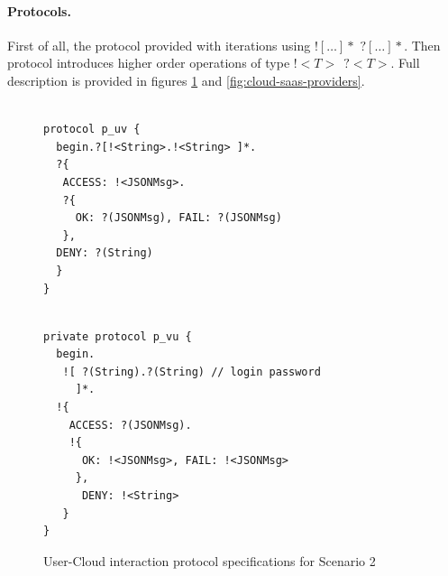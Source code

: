 \documentclass{llncs}
\begin{document}
\paragraph{Protocols.} First of all, the protocol provided with iterations using $![\dots]*$ $?[\dots]*$. Then protocol introduces higher order operations of type $!<T>\ \ ?<T>$. Full description is provided in figures \ref{fig:user-cloud-protocol} and \ref{fig:cloud-saas-providers}.
{
\lstset{
  framerule=0pt,
  numbers=none,
  basicstyle=\ttfamily\scriptsize,
}
\renewcommand\lstlistingname{Protocol}
\setcounter{lstlisting}{0}
\begin{figure}

\begin{minipage}[t]{0.50\textwidth}
\begin{lstlisting}[caption=User]

protocol p_uv { 
  begin.?[!<String>.!<String> ]*.
  ?{
   ACCESS: !<JSONMsg>.
   ?{
     OK: ?(JSONMsg), FAIL: ?(JSONMsg)
   },
  DENY: ?(String)
  } 
}

\end{lstlisting}
\end{minipage}
\begin{minipage}[t]{0.50\textwidth}
\begin{lstlisting}[caption=Cloud]

private protocol p_vu { 
  begin.
   ![ ?(String).?(String) // login password
     ]*.
  !{
    ACCESS: ?(JSONMsg).
    !{
      OK: !<JSONMsg>, FAIL: !<JSONMsg>
     },
      DENY: !<String>
   } 
}

\end{lstlisting}
\end{minipage}
\caption{User-Cloud interaction protocol specifications for Scenario 2}\label{fig:user-cloud-protocol} 
\end{figure}

}
\end{document}
